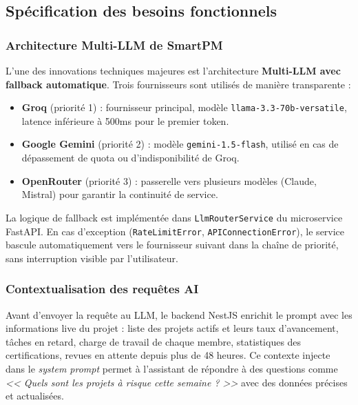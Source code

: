 \subsection{Sp\'ecification des besoins fonctionnels}

\subsubsection{Architecture Multi-LLM de SmartPM}

L'une des innovations techniques majeures est l'architecture
\textbf{Multi-LLM avec fallback automatique}. Trois fournisseurs sont
utilis\'es de mani\`ere transparente :

\begin{itemize}
  \item \textbf{Groq} (priorit\'e 1) : fournisseur principal, mod\`ele
        \texttt{llama-3.3-70b-versatile}, latence inf\'erieure \`a 500ms
        pour le premier token.
  \item \textbf{Google Gemini} (priorit\'e 2) : mod\`ele
        \texttt{gemini-1.5-flash}, utilis\'e en cas de d\'epassement de
        quota ou d'indisponibilit\'e de Groq.
  \item \textbf{OpenRouter} (priorit\'e 3) : passerelle vers plusieurs
        mod\`eles (Claude, Mistral) pour garantir la continuit\'e de service.
\end{itemize}

\vspace{0.3cm}

La logique de fallback est impl\'ement\'ee dans \texttt{LlmRouterService}
du microservice FastAPI. En cas d'exception (\texttt{RateLimitError},
\texttt{APIConnectionError}), le service bascule automatiquement vers le
fournisseur suivant dans la cha\^ine de priorit\'e, sans interruption visible
par l'utilisateur.

\subsubsection{Contextualisation des requ\^etes AI}

Avant d'envoyer la requ\^ete au LLM, le backend NestJS enrichit le prompt
avec les informations live du projet : liste des projets actifs et leurs taux
d'avancement, t\^aches en retard, charge de travail de chaque membre,
statistiques des certifications, revues en attente depuis plus de 48 heures.
Ce contexte injecte dans le \textit{system prompt} permet \`a l'assistant
de r\'epondre \`a des questions comme \textit{<< Quels sont les projets
\`a risque cette semaine ? >>} avec des donn\'ees pr\'ecises et actualis\'ees.

